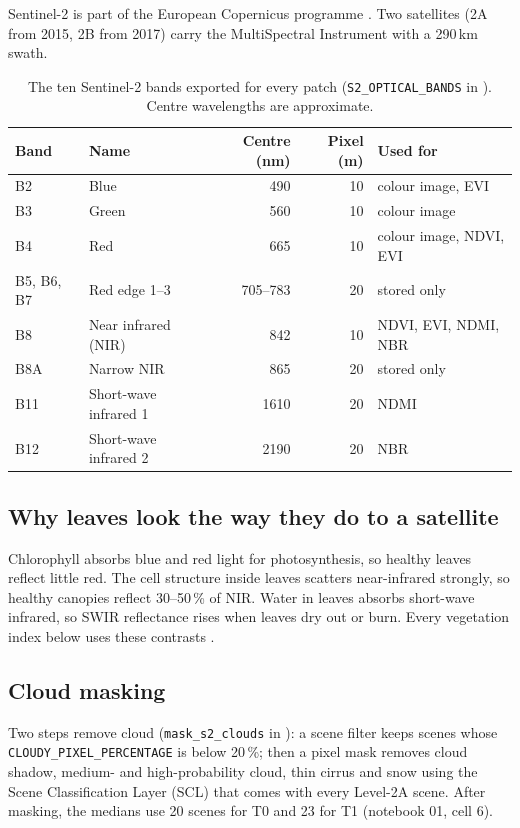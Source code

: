 Sentinel-2 is part of the European Copernicus programme \citep{drusch2012}. Two satellites (2A from 2015, 2B from 2017) carry the MultiSpectral Instrument with a 290\,km swath.

\begin{table}[H]
\centering
\caption{The ten Sentinel-2 bands exported for every patch (\texttt{S2\_OPTICAL\_BANDS} in ). Centre wavelengths are approximate.}
\label{tab:s2bands}
\small
\begin{tabular}{llrrl}
\toprule
Band & Name & Centre (nm) & Pixel (m) & Used for \\
\midrule
B2 & Blue & 490 & 10 & colour image, EVI \\
B3 & Green & 560 & 10 & colour image \\
B4 & Red & 665 & 10 & colour image, NDVI, EVI \\
B5, B6, B7 & Red edge 1--3 & 705--783 & 20 & stored only \\
B8 & Near infrared (NIR) & 842 & 10 & NDVI, EVI, NDMI, NBR \\
B8A & Narrow NIR & 865 & 20 & stored only \\
B11 & Short-wave infrared 1 & 1610 & 20 & NDMI \\
B12 & Short-wave infrared 2 & 2190 & 20 & NBR \\
\bottomrule
\end{tabular}
\end{table}

\subsection{Why leaves look the way they do to a satellite}

Chlorophyll absorbs blue and red light for photosynthesis, so healthy leaves reflect little red. The cell structure inside leaves scatters near-infrared strongly, so healthy canopies reflect 30--50\,\% of NIR. Water in leaves absorbs short-wave infrared, so SWIR reflectance rises when leaves dry out or burn. Every vegetation index below uses these contrasts \citep{tucker1979}.

\subsection{Cloud masking}

Two steps remove cloud (\texttt{mask\_s2\_clouds} in ): a scene filter keeps scenes whose \texttt{CLOUDY\_PIXEL\_PERCENTAGE} is below 20\,\%; then a pixel mask removes cloud shadow, medium- and high-probability cloud, thin cirrus and snow using the Scene Classification Layer (SCL) that comes with every Level-2A scene. After masking, the medians use 20 scenes for T0 and 23 for T1 (notebook 01, cell 6).

